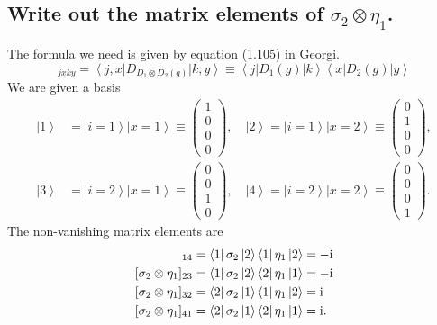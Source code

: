 \documentclass[main.tex]{subfiles}
\begin{document}
\subsection{Write out the matrix elements of $\sigma_2\otimes\eta_1$.}
The formula we need is given by equation (1.105) in Georgi.
\begin{equation}
[D_{D_1\otimes D_2 (g)}]_{jxky}=\left<j,x\right|D_{D_1\otimes D_2 (g)}\left|k,y\right>\equiv\left<j\right|D_1(g)\left|k\right>\left<x\right|D_2(g)\left|y\right>
\end{equation}
We are given a basis
\begin{align}
\left|1\right>&=\left|i=1\right>\left|x=1\right>\equiv\begin{pmatrix}1\\0\\0\\0\end{pmatrix},\quad
\left|2\right>=\left|i=1\right>\left|x=2\right>\equiv\begin{pmatrix}0\\1\\0\\0\end{pmatrix},\\
\left|3\right>&=\left|i=2\right>\left|x=1\right>\equiv\begin{pmatrix}0\\0\\1\\0\end{pmatrix},\quad
\left|4\right>=\left|i=2\right>\left|x=2\right>\equiv\begin{pmatrix}0\\0\\0\\1\end{pmatrix}.
\end{align}
The non-vanishing matrix elements are
\begin{align}
[\sigma_2\otimes\eta_1]_{14}&=\left<1\right|\sigma_2\left|2\right>\left<1\right|\eta_1\left|2\right>=-\img\\
[\sigma_2\otimes\eta_1]_{23}&=\left<1\right|\sigma_2\left|2\right>\left<2\right|\eta_1\left|1\right>=-\img\\
[\sigma_2\otimes\eta_1]_{32}&=\left<2\right|\sigma_2\left|1\right>\left<1\right|\eta_1\left|2\right>=\img\\
[\sigma_2\otimes\eta_1]_{41}&=\left<2\right|\sigma_2\left|1\right>\left<2\right|\eta_1\left|1\right>=\img.
\end{align}
\end{document}
